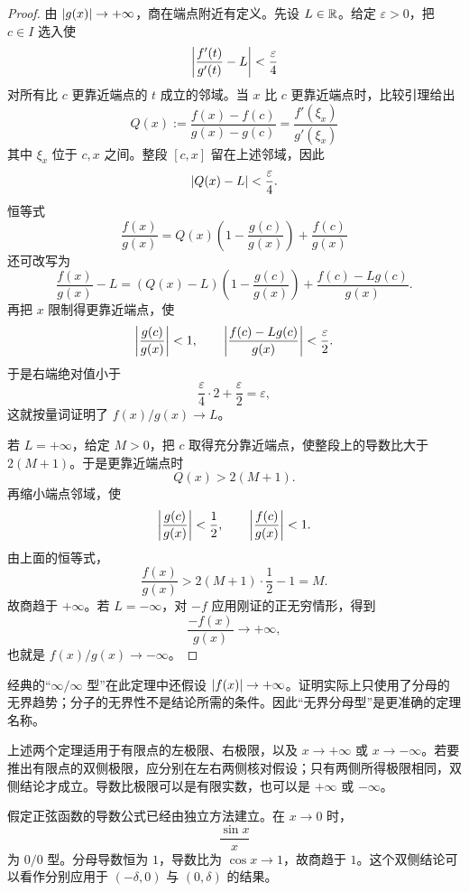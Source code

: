 \begin{proof}
由 \(\left|g(x)\right|\to+\infty\)，商在端点附近有定义。先设 \(L\in\mathbb{R}\)。给定 \(\varepsilon>0\)，把 \(c\in I\) 选入使
\[
 \left|\frac{f'(t)}{g'(t)}-L\right|<\frac{\varepsilon}{4}
\]
对所有比 \(c\) 更靠近端点的 \(t\) 成立的邻域。当 \(x\) 比 \(c\) 更靠近端点时，比较引理给出
\[
 Q(x):=\frac{f(x)-f(c)}{g(x)-g(c)}
 =\frac{f'(\xi_x)}{g'(\xi_x)}
\]
其中 \(\xi_x\) 位于 \(c,x\) 之间。整段 \([c,x]\) 留在上述邻域，因此
\[
 \left|Q(x)-L\right|<\frac{\varepsilon}{4}.
\]
恒等式
\[
 \frac{f(x)}{g(x)}
 =
 Q(x)\left(1-\frac{g(c)}{g(x)}\right)
 +\frac{f(c)}{g(x)}
\]
还可改写为
\[
 \frac{f(x)}{g(x)}-L
 =(Q(x)-L)\left(1-\frac{g(c)}{g(x)}\right)
 +\frac{f(c)-Lg(c)}{g(x)}.
\]
再把 \(x\) 限制得更靠近端点，使
\[
 \left|\frac{g(c)}{g(x)}\right|<1,\qquad
 \left|\frac{f(c)-Lg(c)}{g(x)}\right|<\frac{\varepsilon}{2}.
\]
于是右端绝对值小于
\[
 \frac{\varepsilon}{4}\cdot2+\frac{\varepsilon}{2}
 =\varepsilon,
\]
这就按量词证明了 \(f(x)/g(x)\to L\)。

若 \(L=+\infty\)，给定 \(M>0\)，把 \(c\) 取得充分靠近端点，使整段上的导数比大于 \(2(M+1)\)。于是更靠近端点时
\[
 Q(x)>2(M+1).
\]
再缩小端点邻域，使
\[
 \left|\frac{g(c)}{g(x)}\right|<\frac12,
 \qquad
 \left|\frac{f(c)}{g(x)}\right|<1.
\]
由上面的恒等式，
\[
 \frac{f(x)}{g(x)}
 >2(M+1)\cdot\frac12-1=M.
\]
故商趋于 \(+\infty\)。若 \(L=-\infty\)，对 \(-f\) 应用刚证的正无穷情形，得到
\[
 \frac{-f(x)}{g(x)}\longrightarrow+\infty,
\]
也就是 \(f(x)/g(x)\to-\infty\)。
\end{proof}

经典的“\(\infty/\infty\) 型”在此定理中还假设
\(\left|f(x)\right|\to+\infty\)。证明实际上只使用了分母的无界趋势；分子的无界性不是结论所需的条件。因此“无界分母型”是更准确的定理名称。

\begin{corollary}[单侧、双侧与无穷远版本]
\label{cor:lhopital-directions}
上述两个定理适用于有限点的左极限、右极限，以及 \(x\to+\infty\) 或 \(x\to-\infty\)。若要推出有限点的双侧极限，应分别在左右两侧核对假设；只有两侧所得极限相同，双侧结论才成立。导数比极限可以是有限实数，也可以是 \(+\infty\) 或 \(-\infty\)。
\end{corollary}

\begin{example}[\(0/0\) 与单侧极限]
假定正弦函数的导数公式已经由独立方法建立。在 \(x\to0\) 时，
\[
 \frac{\sin x}{x}
\]
为 \(0/0\) 型。分母导数恒为 \(1\)，导数比为 \(\cos x\to1\)，故商趋于 \(1\)。这个双侧结论可以看作分别应用于 \((-\delta,0)\) 与 \((0,\delta)\) 的结果。
\end{example}

